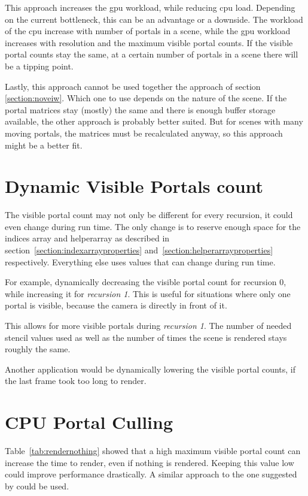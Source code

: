 This approach increases the \gls{gpu} workload, while reducing \gls{cpu} load. Depending on the current bottleneck, this can be an advantage or a downside. The workload of the \gls{cpu} increase with number of portals in a scene, while the \gls{gpu} workload increases with resolution and the maximum visible portal counts. If the visible portal counts stay the same, at a certain number of portals in a scene there will be a tipping point.

Lastly, this approach cannot be used together the approach of section \ref{section:noveiw}. Which one to use depends on the nature of the scene. If the portal matrices stay (mostly) the same and there is enough buffer storage available, the other approach is probably better suited. But for scenes with many moving portals, the matrices must be recalculated anyway, so this approach might be a better fit. 


\section{Dynamic Visible Portals count}
The visible portal count may not only be different for every recursion, it could even change during run time. The only change is to reserve enough space for the indices array and \gls{helperarray} as described in section~\ref{section:indexarrayproperties} and~\ref{section:helperarrayproperties} respectively. Everything else uses values that can change during run time.

For example, dynamically decreasing the visible portal count for recursion 0, while increasing it for \textit{recursion 1}. This is useful for situations where only one portal is visible, because the camera is directly in front of it.

This allows for more visible portals during \textit{recursion 1}. The number of needed stencil values used as well as the number of times the scene is rendered stays roughly the same.

Another application would be dynamically lowering the visible portal counts, if the last frame took too long to render.

\section{CPU Portal Culling}
\label{section:cullingportals}
Table~\ref{tab:rendernothing} showed that a high maximum visible portal count can increase the time to render, even if nothing is rendered. Keeping this value low could improve performance drastically. A similar approach to the one suggested by \textcite{luebke:1995:portals} could be used.

